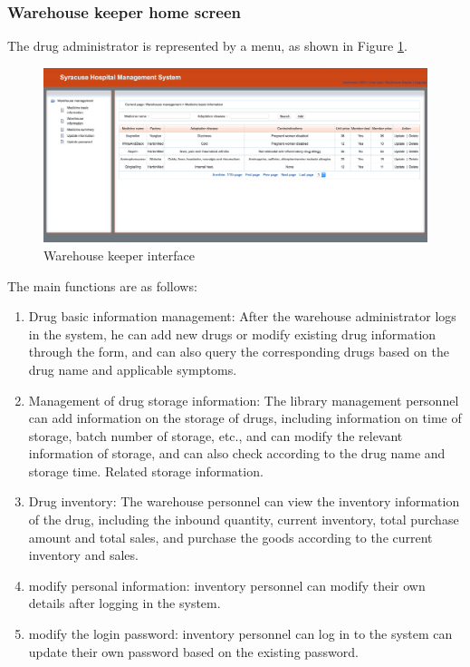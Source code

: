 \subsubsection{Warehouse keeper home screen}
The drug administrator is represented by a menu, as shown in Figure \ref{fig:p11}.
\begin{figure}[H]
    \centering
    \includegraphics[width=\textwidth]{11.png}
    \caption{Warehouse keeper interface}
    \label{fig:p11}
\end{figure}
The main functions are as follows:
\begin{enumerate}
    \item Drug basic information management: After the warehouse administrator logs in the system, he can add new drugs or modify existing drug information through the form, and can also query the corresponding drugs based on the drug name and applicable symptoms.
    \item Management of drug storage information: The library management personnel can add information on the storage of drugs, including information on time of storage, batch number of storage, etc., and can modify the relevant information of storage, and can also check according to the drug name and storage time. Related storage information.
    \item Drug inventory: The warehouse personnel can view the inventory information of the drug, including the inbound quantity, current inventory, total purchase amount and total sales, and purchase the goods according to the current inventory and sales.
    \item  modify personal information: inventory personnel can modify their own details after logging in the system.
    \item modify the login password: inventory personnel can log in to the system can update their own password based on the existing password.
\end{enumerate}

